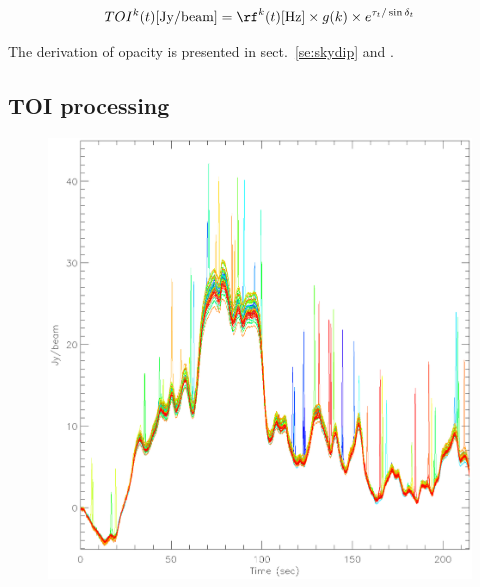 \begin{equation}
TOI^k(t) [{\rm Jy/beam}] = \rf^k(t)[{\rm Hz}] \times g(k) \times e^{\tau_t/\sin\delta_t}
\end{equation}

The derivation of opacity is presented in sect.~\ref{se:skydip} and .

\subsection{TOI processing}
\label{se:toi_proc}

\begin{figure}[hhh]
\begin{center}
\includegraphics[clip, angle=0, scale=0.4]{Figures/toi_plot.eps}

\end{center}
\end{figure}

